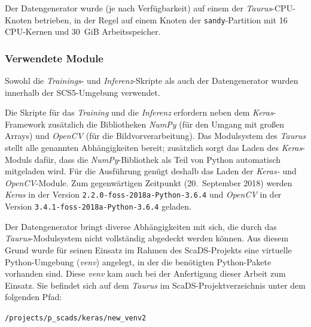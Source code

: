 Der Datengenerator wurde (je nach Verfügbarkeit) auf einem der \textit{Taurus}-CPU-Knoten betrieben, in der Regel auf
einem Knoten der \texttt{sandy}-Partition mit 16 CPU-Kernen und 30\ GiB Arbeitsspeicher.

\subsubsection{Verwendete Module}
\label{daten:taurus:module}

Sowohl die \textit{Trainings}- und \textit{Inferenz}-Skripte als auch der Datengenerator wurden innerhalb der
SCS5-Umgebung verwendet.

Die Skripte für das \textit{Training} und die \textit{Inferenz} erfordern neben dem \textit{Keras}-Framework zusätzlich
die Bibliotheken \textit{NumPy} (für den Umgang mit großen Arrays) und \textit{OpenCV} (für die Bildvorverarbeitung).
Das Modulsystem des \textit{Taurus} stellt alle genannten Abhängigkeiten bereit; zusätzlich sorgt das Laden des
\textit{Keras}-Moduls dafür, dass die \textit{NumPy}-Bibliothek als Teil von Python automatisch mitgeladen wird. Für die
Ausführung genügt deshalb das Laden der \textit{Keras-} und \textit{OpenCV}-Module. Zum gegenwärtigen Zeitpunkt
(20.\ September 2018) werden \textit{Keras} in der Version \texttt{2.2.0-foss-2018a-Python-3.6.4} und \textit{OpenCV} in
der Version \texttt{3.4.1-foss-2018a-Python-3.6.4} geladen.

Der Datengenerator bringt diverse Abhängigkeiten mit sich, die durch das \textit{Taurus}-Modulsystem nicht vollständig
abgedeckt werden können. Aus diesem Grund wurde für seinen Einsatz im Rahmen des ScaDS-Projekts eine virtuelle
Python-Umgebung (\textit{venv}) angelegt, in der die benötigten Python-Pakete vorhanden sind. Diese \textit{venv} kam
auch bei der Anfertigung dieser Arbeit zum Einsatz. Sie befindet sich auf dem \textit{Taurus} im
ScaDS-Projektverzeichnis unter dem folgenden Pfad:

\texttt{/projects/p\_scads/keras/new\_venv2}
